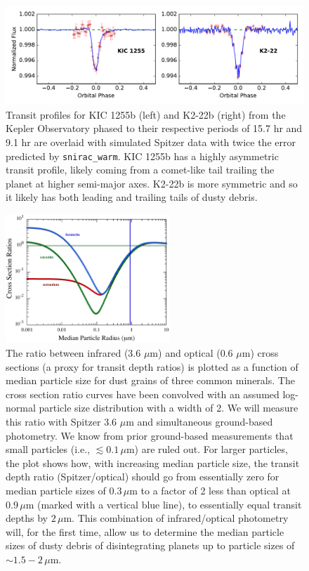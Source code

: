 \documentclass[letterpaper,12pt]{article}
\begin{document}
\begin{figure}
\centering
\includegraphics[width=1.0\textwidth]{transit_profiles.pdf}
\caption{Transit profiles for KIC 1255b (left) and K2-22b (right) from the Kepler Observatory phased to their respective periods of 15.7 hr and 9.1 hr are overlaid with simulated Spitzer data with twice the error predicted by \texttt{snirac\_warm}. KIC 1255b has a highly asymmetric transit profile, likely coming from a comet-like tail trailing the planet at higher semi-major axes.
K2-22b is more symmetric and so it likely has both leading and trailing tails of dusty debris.}\label{fig:TransitProfiles}
\end{figure}

\begin{figure}
\centering
\includegraphics[width=0.55\textwidth]{particle_size_constraints.pdf}
\caption{The ratio between infrared (3.6 $\mu$m) and optical (0.6 $\mu$m) cross sections (a proxy for transit depth ratios) is plotted as a function of median particle size for dust grains of three common minerals.
The cross section ratio curves have been convolved with an assumed log-normal particle size distribution with a width of 2. 
We will measure this ratio with Spitzer 3.6 $\mu$m and simultaneous ground-based photometry.
We know from prior ground-based measurements that small particles (i.e., $\lesssim 0.1 \, \mu$m) are ruled out.  
For larger particles, the plot shows how, with increasing median particle size, the transit depth ratio (Spitzer/optical) should go from essentially zero for median particle sizes of $0.3 \, \mu$m to a factor of 2 less than optical at $0.9 \, \mu$m (marked with a vertical blue line), to essentially equal transit depths by $2 \, \mu$m. 
This combination of infrared/optical photometry will, for the first time, allow us to determine the median particle sizes of dusty debris of disintegrating planets up to particle sizes of $\sim$$1.5-2 \,\mu$m.}\label{fig:SizeConstraints}
\end{figure}
\end{document}
